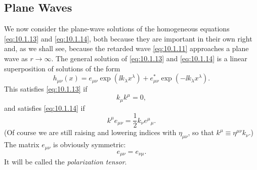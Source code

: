 
\subsection{Plane Waves}\label{sec:10.2}

We now consider the plane-wave solutions of the homogeneous equations
\eqref{eq:10.1.13} and \eqref{eq:10.1.14}, both because they are important
in their own right and, as we shall see, because the retarded wave
\eqref{eq:10.1.11} approaches a plane wave as \(r\to\infty\). The general
solution of \eqref{eq:10.1.13} and \eqref{eq:10.1.14} is a linear
superposition of solutions of the form
\begin{equation}
  h_{\mu\nu}(x)
  =
  e_{\mu\nu}\exp(\ii k_\lambda x^\lambda)
  +e_{\mu\nu}^*\exp(-\ii k_\lambda x^\lambda).
  \tag{10.2.1}\label{eq:10.2.1}
\end{equation}
This satisfies \eqref{eq:10.1.13} if
\begin{equation}
  k_\mu k^\mu=0,
  \tag{10.2.2}\label{eq:10.2.2}
\end{equation}
and satisfies \eqref{eq:10.1.14} if
\begin{equation}
  k^\mu e_{\mu\nu}
  =
  \frac12 k_\nu e^\mu{}_\mu.
  \tag{10.2.3}\label{eq:10.2.3}
\end{equation}
(Of course we are still raising and lowering indices with
\(\eta_{\mu\nu}\), so that \(k^\mu\equiv\eta^{\mu\nu}k_\nu\).) The matrix
\(e_{\mu\nu}\) is obviously symmetric:
\begin{equation}
  e_{\mu\nu}=e_{\nu\mu}.
  \tag{10.2.4}\label{eq:10.2.4}
\end{equation}
It will be called the \emph{polarization tensor}.

